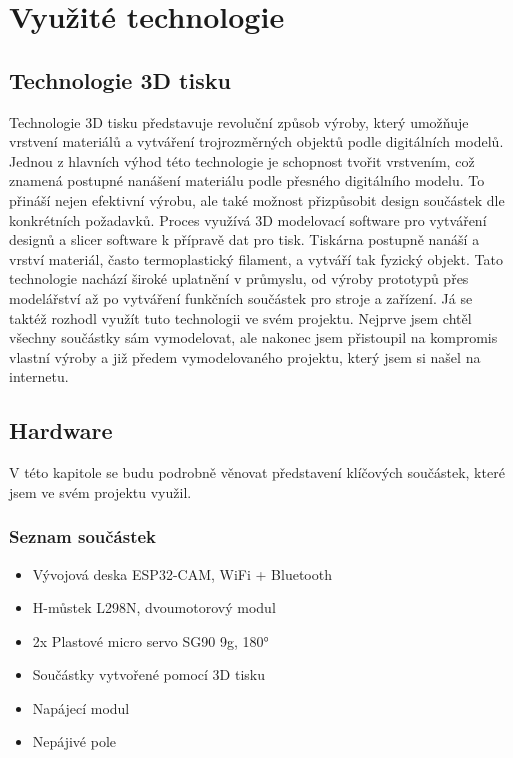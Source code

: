 \documentclass[12pt, a4paper,
oneside
openany
]{report}
\begin{document}
\chapter{Využité technologie}

\section{Technologie 3D tisku}
\noindent Technologie 3D tisku představuje revoluční způsob výroby, který umožňuje vrstvení materiálů a vytváření trojrozměrných objektů podle digitálních modelů. Jednou z hlavních výhod této technologie je schopnost tvořit vrstvením, což znamená postupné nanášení materiálu podle přesného digitálního modelu. To přináší nejen efektivní výrobu, ale také možnost přizpůsobit design součástek dle konkrétních požadavků. Proces využívá 3D modelovací software pro vytváření designů a slicer software k přípravě dat pro tisk. Tiskárna postupně nanáší a vrství materiál, často termoplastický filament, a vytváří tak fyzický objekt. Tato technologie nachází široké uplatnění v průmyslu, od výroby prototypů přes modelářství až po vytváření funkčních součástek pro stroje a zařízení. Já se taktéž rozhodl využít tuto technologii ve svém projektu. Nejprve jsem chtěl všechny součástky sám vymodelovat, ale nakonec jsem přistoupil na kompromis vlastní výroby a již předem vymodelovaného projektu, který jsem si našel na internetu.

\section{Hardware}
\label{sec:zakladni_struktura}

V této kapitole se budu podrobně věnovat představení klíčových součástek, které jsem ve svém projektu využil.

\newpage

\subsection{Seznam součástek}

\begin{itemize}
  \item Vývojová deska ESP32-CAM, WiFi + Bluetooth
  \item H-můstek L298N, dvoumotorový modul
  \item 2x Plastové micro servo SG90 9g, 180°
  \item Součástky vytvořené pomocí 3D tisku
  \item Napájecí modul
  \item Nepájivé pole
\end{itemize}
\end{document}
